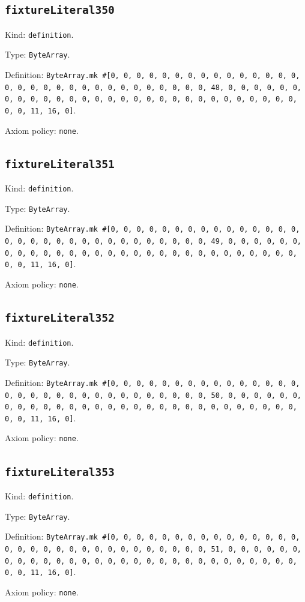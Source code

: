 \documentclass[11pt]{article}
\begin{document}
\subsection*{\texttt{fixtureLiteral350}}
\noindent Kind: \texttt{definition}.\par
\noindent Type: \texttt{ByteArray}.\par
\noindent Definition: \texttt{ByteArray.mk \#[0, 0, 0, 0, 0, 0, 0, 0, 0, 0, 0, 0, 0, 0, 0, 0, 0, 0, 0, 0, 0, 0, 0, 0, 0, 0, 0, 0, 0, 0, 0, 48, 0, 0, 0, 0, 0, 0, 0, 0, 0, 0, 0, 0, 0, 0, 0, 0, 0, 0, 0, 0, 0, 0, 0, 0, 0, 0, 0, 0, 0, 0, 0, 11, 16, 0]}.\par
\noindent Axiom policy: \texttt{none}.\par
\subsection*{\texttt{fixtureLiteral351}}
\noindent Kind: \texttt{definition}.\par
\noindent Type: \texttt{ByteArray}.\par
\noindent Definition: \texttt{ByteArray.mk \#[0, 0, 0, 0, 0, 0, 0, 0, 0, 0, 0, 0, 0, 0, 0, 0, 0, 0, 0, 0, 0, 0, 0, 0, 0, 0, 0, 0, 0, 0, 0, 49, 0, 0, 0, 0, 0, 0, 0, 0, 0, 0, 0, 0, 0, 0, 0, 0, 0, 0, 0, 0, 0, 0, 0, 0, 0, 0, 0, 0, 0, 0, 0, 11, 16, 0]}.\par
\noindent Axiom policy: \texttt{none}.\par
\subsection*{\texttt{fixtureLiteral352}}
\noindent Kind: \texttt{definition}.\par
\noindent Type: \texttt{ByteArray}.\par
\noindent Definition: \texttt{ByteArray.mk \#[0, 0, 0, 0, 0, 0, 0, 0, 0, 0, 0, 0, 0, 0, 0, 0, 0, 0, 0, 0, 0, 0, 0, 0, 0, 0, 0, 0, 0, 0, 0, 50, 0, 0, 0, 0, 0, 0, 0, 0, 0, 0, 0, 0, 0, 0, 0, 0, 0, 0, 0, 0, 0, 0, 0, 0, 0, 0, 0, 0, 0, 0, 0, 11, 16, 0]}.\par
\noindent Axiom policy: \texttt{none}.\par
\subsection*{\texttt{fixtureLiteral353}}
\noindent Kind: \texttt{definition}.\par
\noindent Type: \texttt{ByteArray}.\par
\noindent Definition: \texttt{ByteArray.mk \#[0, 0, 0, 0, 0, 0, 0, 0, 0, 0, 0, 0, 0, 0, 0, 0, 0, 0, 0, 0, 0, 0, 0, 0, 0, 0, 0, 0, 0, 0, 0, 51, 0, 0, 0, 0, 0, 0, 0, 0, 0, 0, 0, 0, 0, 0, 0, 0, 0, 0, 0, 0, 0, 0, 0, 0, 0, 0, 0, 0, 0, 0, 0, 11, 16, 0]}.\par
\noindent Axiom policy: \texttt{none}.\par
\end{document}
